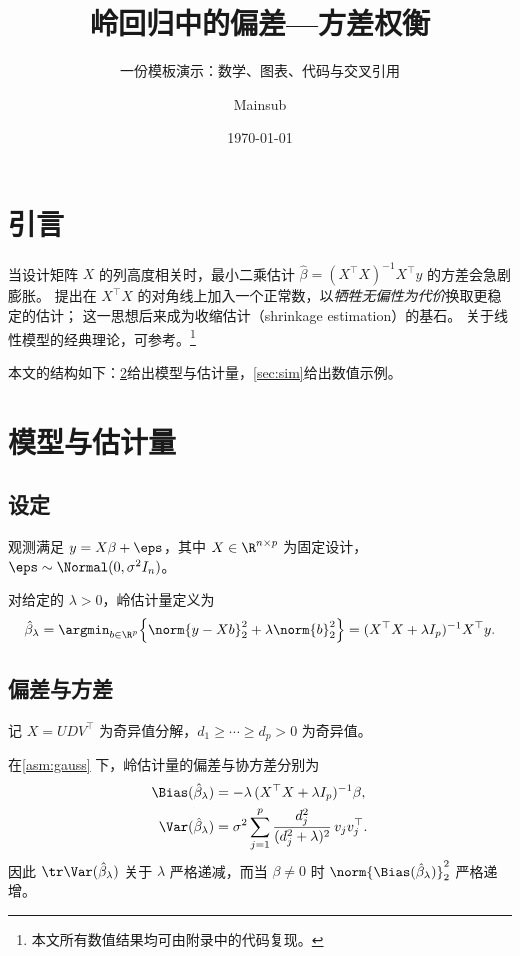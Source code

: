 \documentclass[lang=zh]{mainsub-report}
\title{岭回归中的偏差—方差权衡}
\subtitle{一份模板演示：数学、图表、代码与交叉引用}
\author{Mainsub}
\affiliation{中国科学技术大学}
\date{\today}
\begin{document}
\maketitle

\section{引言}

当设计矩阵 $X$ 的列高度相关时，最小二乘估计 $\hat\beta = (X^\top X)^{-1}X^\top y$ 的方差会急剧膨胀。
\textcite{hoerl1970ridge} 提出在 $X^\top X$ 的对角线上加入一个正常数，以\emph{牺牲无偏性为代价}换取更稳定的估计；
这一思想后来成为收缩估计（shrinkage estimation）的基石\parencite{hastie2009elements}。
关于线性模型的经典理论，可参考\textcite{chen1999advanced}。\footnote{本文所有数值结果均可由附录中的代码复现。}

本文的结构如下：\cref{sec:model}给出模型与估计量，\cref{sec:sim}给出数值示例。

\section{模型与估计量}\label{sec:model}

\subsection{设定}

\begin{assumption}[高斯线性模型]\label{asm:gauss}
观测满足 $y = X\beta + \eps$，其中 $X\in\R^{n\times p}$ 为固定设计，$\eps \sim \Normal(0, \sigma^2 I_n)$。
\end{assumption}

\begin{definition}[岭估计量]\label{def:ridge}
对给定的 $\lambda > 0$，岭估计量定义为
\begin{equation}\label{eq:ridge}
  \hat\beta_\lambda
  = \argmin_{b\in\R^p} \Bigl\{ \norm{y - Xb}_2^2 + \lambda \norm{b}_2^2 \Bigr\}
  = (X^\top X + \lambda I_p)^{-1} X^\top y .
\end{equation}
\end{definition}

\subsection{偏差与方差}

记 $X = UDV^\top$ 为奇异值分解，$d_1\ge\cdots\ge d_p>0$ 为奇异值。

\begin{proposition}\label{prop:bv}
在\cref{asm:gauss} 下，岭估计量的偏差与协方差分别为
\begin{align}
  \Bias(\hat\beta_\lambda) &= -\lambda\,(X^\top X + \lambda I_p)^{-1}\beta, \label{eq:bias}\\
  \Var(\hat\beta_\lambda)  &= \sigma^2 \sum_{j=1}^{p} \frac{d_j^2}{(d_j^2+\lambda)^2}\, v_j v_j^\top . \label{eq:var}
\end{align}
因此 $\tr\Var(\hat\beta_\lambda)$ 关于 $\lambda$ 严格递减，而当 $\beta\neq0$ 时 $\norm{\Bias(\hat\beta_\lambda)}_2^2$ 严格递增。
\end{proposition}
\end{document}
